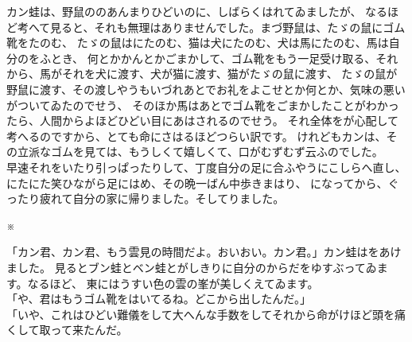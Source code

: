 \documentclass[
a4paper,
10pt,
book]
{tarticle}
\begin{document}
\newpage
\setcounter{page}{6}
\thispagestyle{fancy}

\indent カン蛙は、野鼠ののあんまりひどいのに、しばらくはれてゐましたが、
なるほど考へて見ると、それも無理はありませんでした。まづ野鼠は、たゞの鼠にゴム靴をたのむ、
たゞの鼠はにたのむ、猫は犬にたのむ、犬は馬にたのむ、馬は自分のをふとき、
何とかかんとかごまかして、ゴム靴をもう一足受け取る、それから、馬がそれを犬に渡す、犬が猫に渡す、猫がたゞの鼠に渡す、
たゞの鼠が野鼠に渡す、その渡しやうもいづれあとでお礼をよこせとか何とか、気味の悪いがついてゐたのでせう、
そのほか馬はあとでゴム靴をごまかしたことがわかったら、人間からよほどひどい目にあはされるのでせう。
それ全体をが心配して考へるのですから、とても命にさはるほどつらい訳です。
けれどもカンは、その立派なゴムを見ては、もうしくて嬉しくて、口がむずむず云ふのでした。\\
\indent 早速それをいたり引っぱったりして、丁度自分の足に合ふやうにこしらへ直し、にたにた笑ひながら足にはめ、その晩一ばん中歩きまはり、
になってから、ぐったり疲れて自分の家に帰りました。そしてりました。


\nolinenumbers
\indent \indent \indent \indent \indent \indent \indent \indent \indent \indent ※


「カン君、カン君、もう雲見の時間だよ。おいおい。カン君。」カン蛙はをあけました。
見るとブン蛙とベン蛙とがしきりに自分のからだをゆすぶってゐます。なるほど、
東にはうすい色の雲の峯が美しくえてゐます。\\
「や、君はもうゴム靴をはいてるね。どこから出したんだ。」\\
「いや、これはひどい難儀をして大へんな手数をしてそれから命がけほど頭を痛くして取って来たんだ。


\newpage
\setcounter{page}{10}
\thispagestyle{fancy}
\end{document}
